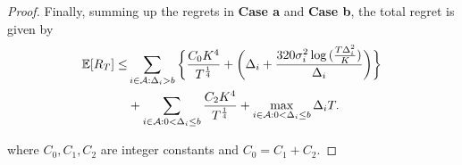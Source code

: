 \begin{proof}
Finally, summing up the regrets in \textbf{Case a} and \textbf{Case b}, the total regret is given by
\begin{align*}
\mathbb{E} [R_{T}] \leq &\sum\limits_{i\in \mathcal{A} :\Delta_{i} > b}\bigg\lbrace \dfrac{C_0 K^{4}}{T^{\frac{1}{4}}} + \bigg(\Delta_{i}+\dfrac{320\sigma_i^2\log{(\frac{T\Delta_{i}^{2}}{K})}}{\Delta_{i}}\bigg)\bigg \rbrace\\ 
  & +\sum\limits_{i\in \mathcal{A} :0 < \Delta_{i}\leq b} \dfrac{C_2 K^{4}}{T^{\frac{1}{4}}} + \max_{i\in \mathcal{A} :0 < \Delta_{i}\leq b}\Delta_{i}T.
\end{align*}

where $C_0, C_1, C_2$ are integer constants and $C_0 = C_1 + C_2$.
\end{proof}


